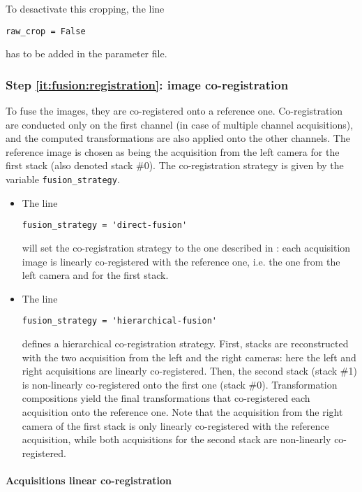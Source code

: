 To desactivate this cropping, the line
\begin{verbatim}
raw_crop = False
\end{verbatim}
has to be added in the parameter file.

\subsubsection{Step \ref{it:fusion:registration}: image co-registration}
\label{sec:cli:fuse:image:coregistration}

To fuse the images, they are co-registered onto a reference one. Co-registration are conducted only on the first channel (in case of multiple channel acquisitions), and the computed transformations are also applied onto the other channels. The reference image is chosen as being the acquisition from the left camera for the first stack (also denoted stack \#0). The co-registration strategy is given by the variable \texttt{fusion\_strategy}.

\begin{itemize}
\item The line
\begin{verbatim}
fusion_strategy = 'direct-fusion'
\end{verbatim}
will set the co-registration strategy to the one described in \cite{guignard:tel-01278725,guignard:hal-01938126}: each acquisition image is linearly co-registered with the reference one, i.e. the one from the left camera and for the first stack.
\item The line
\begin{verbatim}
fusion_strategy = 'hierarchical-fusion'
\end{verbatim}
defines a hierarchical  co-registration  strategy. First, stacks are reconstructed with the two acquisition from the left and the right cameras: here the left and right acquisitions are linearly co-registered. Then, the second stack (stack \#1) is non-linearly co-registered onto the first one (stack \#0). Transformation compositions yield the final transformations that co-registered each acquisition onto the reference one. Note that the acquisition from the right camera of the first stack is only linearly co-registered with the reference acquisition, while both acquisitions for the second stack are non-linearly co-registered.
\end{itemize}


\paragraph{Acquisitions linear co-registration}

